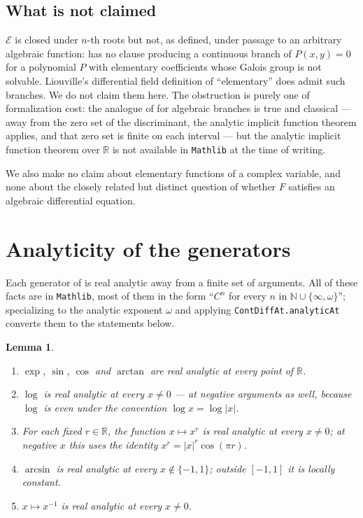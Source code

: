 \documentclass[11pt,oneside]{article}
\newtheorem{lemma}[theorem]{Lemma}
\theoremstyle{definition}
\theoremstyle{remark}
\newcommand{\R}{\mathbb R}
\newcommand{\N}{\mathbb N}
\newcommand{\Elem}{\mathcal E}
\begin{document}
\subsection{What is not claimed}\label{sec:notclaimed}

$\Elem$ is closed under $n$-th roots but not, as defined, under passage to an
arbitrary algebraic function:  has no clause producing a
continuous branch of $P(x,y)=0$ for a polynomial $P$ with elementary
coefficients whose Galois group is not solvable.  Liouville's differential
field definition of ``elementary'' does admit such branches.  We do not claim
them here.  The obstruction is purely one of formalization cost: the analogue
of  for algebraic branches is true and classical --- away
from the zero set of the discriminant, the analytic implicit function theorem
applies, and that zero set is finite on each interval --- but the analytic
implicit function theorem over $\R$ is not available in \texttt{Mathlib} at
the time of writing.

We also make no claim about elementary functions of a complex variable, and
none about the closely related but distinct question of whether $F$ satisfies
an algebraic differential equation.

\section{Analyticity of the generators}

Each generator of  is real analytic away from a finite set of
arguments.  All of these facts are in \texttt{Mathlib}, most of them in the
form ``$C^n$ for every $n$ in $\N\cup\{\infty,\omega\}$''; specializing to the
analytic exponent $\omega$ and applying \texttt{ContDiffAt.analyticAt}
converts them to the statements below.

\begin{lemma}\label{lem:generators}
\leavevmode
\begin{enumerate}
\item $\exp$, $\sin$, $\cos$ and $\arctan$ are real analytic at every point
      of $\R$.
\item $\log$ is real analytic at every $x\ne 0$ --- at negative arguments as
      well, because $\log$ is even under the convention $\log x=\log|x|$.
\item For each fixed $r\in\R$, the function $x\mapsto x^{r}$ is real analytic
      at every $x\ne 0$; at negative $x$ this uses the identity
      $x^{r}=|x|^{r}\cos(\pi r)$.
\item $\arcsin$ is real analytic at every $x\notin\{-1,1\}$; outside
      $[-1,1]$ it is locally constant.
\item $x\mapsto x^{-1}$ is real analytic at every $x\ne 0$.
\end{enumerate}
\end{lemma}
\end{document}
